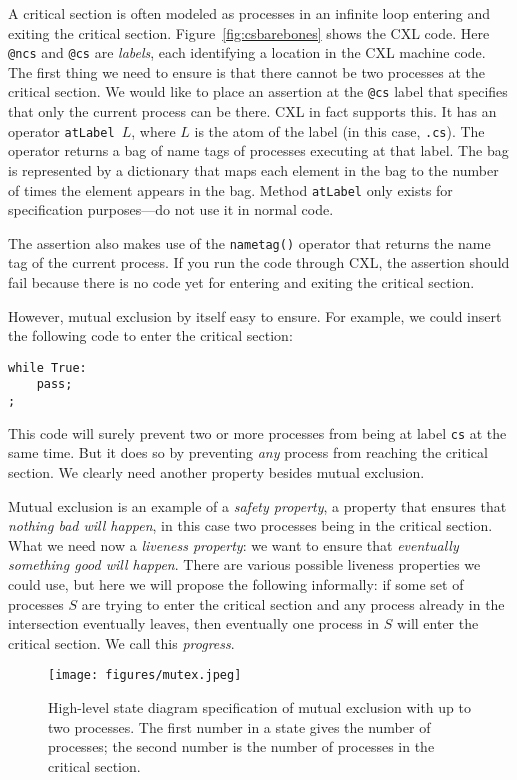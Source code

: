 \documentclass{report}
\newenvironment{code}{
\tcolorbox
}{
\endtcolorbox
}
\begin{document}
A critical section is often modeled as processes in an infinite loop
entering and exiting the critical section.
Figure~\ref{fig:csbarebones} shows the CXL code.
Here \texttt{@ncs} and \texttt{@cs} are \emph{labels}, each identifying
a location in the CXL machine code.  The first thing we need to
ensure is that there cannot be two processes at the critical section.
We would like to place an assertion at the \texttt{@cs} label that
specifies that only the current process can be there.  CXL in fact
supports this.  It has an operator \texttt{atLabel $L$}, where $L$
is the atom of the label (in this case, \texttt{.cs}).  The
operator returns a bag of name tags of processes executing at that
label.  The bag is represented by a dictionary that maps each element
in the bag to the number of times the element appears in the bag.
Method \texttt{atLabel} only exists for specification purposes---do not
use it in normal code.

The assertion also makes use of the \texttt{nametag()} operator that
returns the name tag of the current process.
If you run the code through CXL, the assertion should fail because
there is no code yet for entering and exiting the critical section.

However, mutual exclusion by itself easy to ensure.
For example, we could insert the following code to enter the
critical section:
\begin{code}
\begin{verbatim}
while True:
    pass;
;
\end{verbatim}
\end{code}
This code will surely prevent two or more processes from being
at label \texttt{cs} at the same time.
But it does so by preventing \emph{any} process from reaching
the critical section.
We clearly need another property besides mutual exclusion.

Mutual exclusion is an example of a \emph{safety property}, a
property that ensures that \emph{nothing bad will happen}, in this case
two processes being in the critical section.
What we need now a \emph{liveness property}: we want to ensure that
\emph{eventually something good will happen}.
There are various possible liveness properties we could use,
but here we will propose the following informally: if some set of processes
$S$ are trying to enter the critical section and any process already in the
intersection eventually leaves, then eventually one process in $S$ will enter
the critical section.
We call this \emph{progress}.

\begin{figure}
\begin{center}
\texttt{[image: figures/mutex.jpeg]}
\end{center}
\caption{High-level state diagram specification of mutual exclusion with up to two processes.
The first number in a state gives the number of processes; the second number is the
number of processes in the critical section.}
\label{fig:mutex}
\end{figure}
\end{document}
